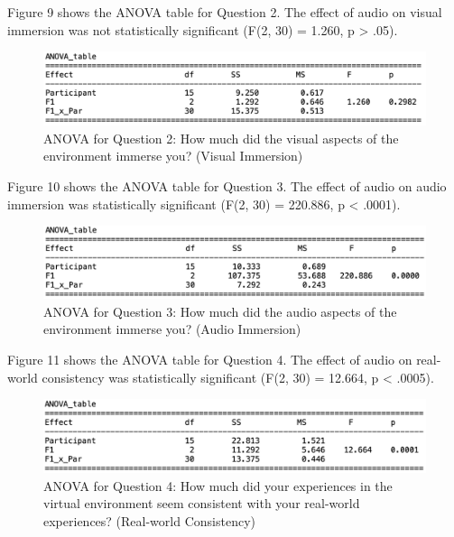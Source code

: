 \documentclass[manuscript,screen,review]{acmart}
\begin{document}
Figure 9 shows the ANOVA table for Question 2. The effect of audio on visual immersion was not statistically significant (F(2, 30) = 1.260, p > .05).

\begin{figure}[ht]
  \centering
  \includegraphics[width=\linewidth]{Q2ANOVA.png}
  \caption{ANOVA for Question 2:  How much did the visual aspects of the environment immerse you? (Visual Immersion)}
\end{figure}



Figure 10 shows the ANOVA table for Question 3. The effect of audio on audio immersion was statistically significant (F(2, 30) = 220.886, p < .0001).

\begin{figure}[ht]
  \centering
  \includegraphics[width=\linewidth]{Q3ANOVA.png}
  \caption{ANOVA for Question 3:  How much did the audio aspects of the environment immerse you? (Audio Immersion)}
\end{figure}



Figure 11 shows the ANOVA table for Question 4. The effect of audio on real-world consistency was statistically significant (F(2, 30) = 12.664, p < .0005).

\begin{figure}[ht]
  \centering
  \includegraphics[width=\linewidth]{Q4ANOVA.png}
  \caption{ANOVA for Question 4:  How much did your experiences in the virtual environment seem consistent with your real-world experiences? (Real-world Consistency)}
\end{figure}
\end{document}
